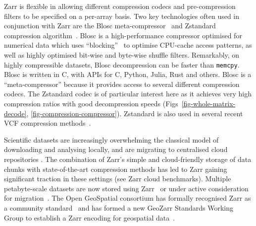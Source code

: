\documentclass[a4paper,num-refs]{oup-contemporary}
\begin{document}
Zarr is flexible in allowing different compression codecs and
pre-compression filters to be specified on a per-array basis.
Two key technologies often used in conjunction with Zarr are the Blosc
meta-compressor~\cite{alted2010modern}
and Zstandard compression algorithm~\citep{collet2021rfc}.
Blosc is a high-performance compressor optimised for numerical
data which uses ``blocking''~\citep{alted2010modern} to
optimise CPU-cache access patterns, as well as highly optimised
bit-wise and byte-wise shuffle filters.  Remarkably, on highly
compressible datasets, Blosc decompression can be faster
than \texttt{memcpy}.
Blosc is written in C, with APIs for C, Python, Julia, Rust
and others.
Blosc is a ``meta-compressor'' because it provides
access to several different compression codecs. The
Zstandard codec is of particular
interest here as it achieves very high compression ratios
with good decompression speeds (Figs~\ref{fig-whole-matrix-decode},
\ref{fig-compression-compressor}).
Zstandard is also used in several recent VCF compression
methods~\citep[e.g.][]{lefaive2021sparse,wertenbroek2022xsi}.

Scientific datasets are increasingly overwhelming the classical
model of downloading and analysing locally, and are migrating to
centralised cloud repositories \citep{abernathey2021cloud,moore2021ome}.
The combination of Zarr's simple and cloud-friendly storage
of data chunks with state-of-the-art compression methods has
led to Zarr gaining significant traction in these settings
(see \citep{durbin2020task,moore2021ome,gowan2022using} 
Zarr cloud benchmarks).
Multiple petabyte-scale datasets are now stored using
Zarr~\cite[e.g.][]{gowan2022using, %
fahnestock2023mappin, %
cmip6_dataset}
or under active consideration for migration~\citep{durbin2020task,abernathey2021opening}.
The Open GeoSpatial consortium has formally recognised Zarr as a community
standard~\cite{ogc_zarr2_standard}
and has formed
a new GeoZarr Standards Working Group to establish a Zarr encoding for
geospatial data~\cite{ogc_geozarr_news}.
\end{document}

